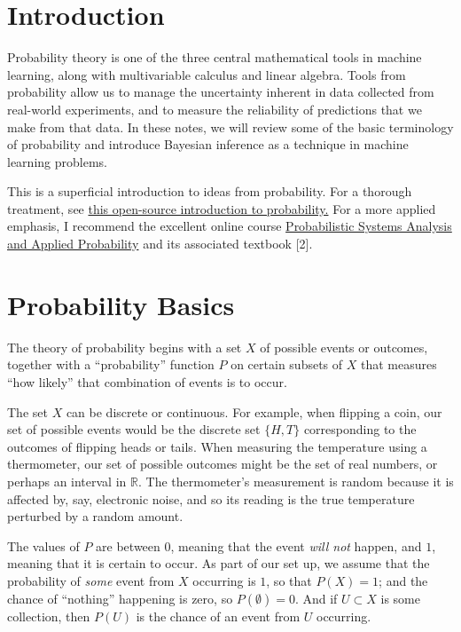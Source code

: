 \documentclass[
  11pt,
  letterpaper,
]{scrbook}
\theoremstyle{plain}
\theoremstyle{remark}
\begin{document}
\hypertarget{introduction-1}{%
\section{Introduction}\label{introduction-1}}

Probability theory is one of the three central mathematical tools in
machine learning, along with multivariable calculus and linear algebra.
Tools from probability allow us to manage the uncertainty inherent in
data collected from real-world experiments, and to measure the
reliability of predictions that we make from that data. In these notes,
we will review some of the basic terminology of probability and
introduce Bayesian inference as a technique in machine learning
problems.

This is a superficial introduction to ideas from probability. For a
thorough treatment, see
\href{https://probability.oer.math.uconn.edu/3160-oer}{this open-source
introduction to probability.} For a more applied emphasis, I recommend
the excellent online course
\href{https://ocw.mit.edu/courses/electrical-engineering-and-computer-science/6-041-probabilistic-systems-analysis-and-applied-probability-fall-2010/}{Probabilistic
Systems Analysis and Applied Probability} and its associated textbook
{[}2{]}.

\hypertarget{probability-basics}{%
\section{Probability Basics}\label{probability-basics}}

The theory of probability begins with a set \(X\) of possible events or
outcomes, together with a ``probability'' function \(P\) on certain
subsets of \(X\) that measures ``how likely'' that combination of events
is to occur.

The set \(X\) can be discrete or continuous. For example, when flipping
a coin, our set of possible events would be the discrete set \(\{H,T\}\)
corresponding to the outcomes of flipping heads or tails. When measuring
the temperature using a thermometer, our set of possible outcomes might
be the set of real numbers, or perhaps an interval in \(\mathbb{R}\).
The thermometer's measurement is random because it is affected by, say,
electronic noise, and so its reading is the true temperature perturbed
by a random amount.

The values of \(P\) are between \(0\), meaning that the event \emph{will
not} happen, and \(1\), meaning that it is certain to occur. As part of
our set up, we assume that the probability of \emph{some} event from
\(X\) occurring is \(1\), so that \(P(X)=1\); and the chance of
``nothing'' happening is zero, so \(P(\emptyset)=0\). And if
\(U\subset X\) is some collection, then \(P(U)\) is the chance of an
event from \(U\) occurring.
\end{document}
